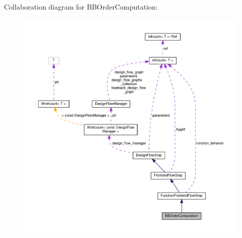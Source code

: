 Collaboration diagram for B\+B\+Order\+Computation\+:
\nopagebreak
\begin{figure}[H]
\begin{center}
\leavevmode
\includegraphics[width=350pt]{d6/d44/classBBOrderComputation__coll__graph}
\end{center}
\end{figure}
